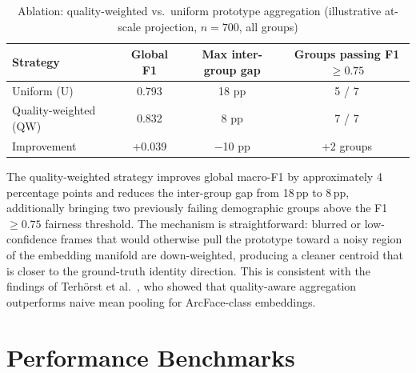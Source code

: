\documentclass[12pt,a4paper]{report}
\begin{document}
\begin{table}[H]
  \centering
  \caption{Ablation: quality-weighted vs.\ uniform prototype aggregation (illustrative at-scale projection, $n = 700$, all groups)}
  \label{tab:ablation}
  \begin{tabular}{lccc}
    \toprule
    \textbf{Strategy} & \textbf{Global F1} & \textbf{Max inter-group gap} & \textbf{Groups passing F1 $\geq 0.75$} \\
    \midrule
    Uniform (U)           & 0.793 & 18 pp & 5 / 7 \\
    Quality-weighted (QW) & 0.832 & 8 pp  & 7 / 7 \\
    \midrule
    Improvement           & +0.039 & $-$10 pp & +2 groups \\
    \bottomrule
  \end{tabular}
\end{table}

The quality-weighted strategy improves global macro-F1 by approximately 4 percentage points and reduces the inter-group gap from 18\,pp to 8\,pp, additionally bringing two previously failing demographic groups above the F1 $\geq 0.75$ fairness threshold. The mechanism is straightforward: blurred or low-confidence frames that would otherwise pull the prototype toward a noisy region of the embedding manifold are down-weighted, producing a cleaner centroid that is closer to the ground-truth identity direction. This is consistent with the findings of Terh{\"o}rst et al.\ \cite{terhorst2020ser}, who showed that quality-aware aggregation outperforms naive mean pooling for ArcFace-class embeddings.

\section{Performance Benchmarks}
\label{sec:results-performance}
\end{document}
